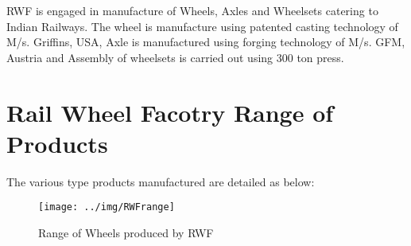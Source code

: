 RWF is engaged in manufacture of Wheels, Axles and Wheelsets catering to Indian Railways. The wheel is manufacture using patented casting technology of M/s. Griffins, USA, Axle is manufactured using forging technology of M/s. GFM, Austria and  Assembly of wheelsets is carried out using 300 ton press.

\section{Rail Wheel Facotry Range of Products}

The various type products manufactured are detailed as below:

\begin{figure}
\centering
\texttt{[image: ../img/RWFrange]}
\caption[Wheel Dimentions]{Range of Wheels produced by RWF}
\label{fig:RWFrange}
\end{figure}


